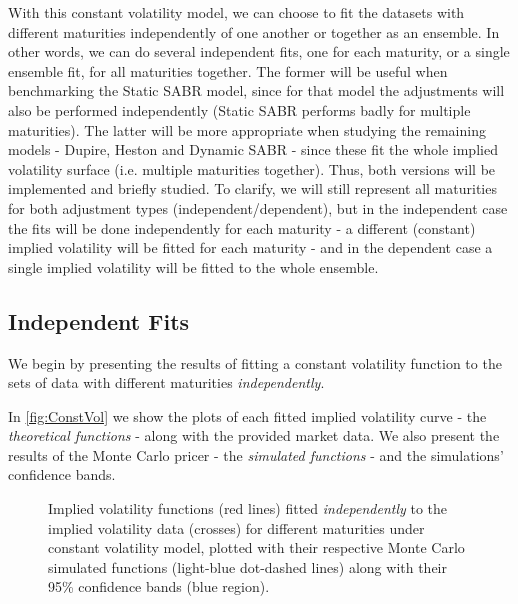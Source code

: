 With this constant volatility model, we can choose to fit the datasets with different maturities independently of one another or together as an ensemble. In other words, we can do several independent fits, one for each maturity, or a single ensemble fit, for all maturities together. The former will be useful when benchmarking the Static SABR model, since for that model the adjustments will also be performed independently (Static SABR performs badly for multiple maturities). The latter will be more appropriate when studying the remaining models - Dupire, Heston and Dynamic SABR - since these fit the whole implied volatility surface (i.e. multiple maturities together). Thus, both versions will be implemented and briefly studied. To clarify, we will still represent all maturities for both adjustment types (independent/dependent), but in the independent case the fits will be done independently for each maturity - a different (constant) implied volatility will be fitted for each maturity - and in the dependent case a single implied volatility will be fitted to the whole ensemble.


\newpage
\subsection{Independent Fits}
We begin by presenting the results of fitting a constant volatility function to the sets of data with different maturities \emph{independently}.


In \autoref{fig:ConstVol} we show the plots of each fitted implied volatility curve - the \emph{theoretical functions} - along with the provided market data. We also present the results of the Monte Carlo pricer - the \emph{simulated functions} - and the simulations' confidence bands.
\begin{figure}[H]
  \begin{subfigmatrix}{2}
  \end{subfigmatrix}
  \caption[Implied volatility functions fitted independently to the implied volatility data for different maturities under constant volatility model, plotted with their respective Monte Carlo simulated functions along with their confidence bands.]{Implied volatility functions (red lines) fitted \emph{independently} to the implied volatility data (crosses) for different maturities under constant volatility model, plotted with their respective Monte Carlo simulated functions (light-blue dot-dashed lines) along with their 95\% confidence bands (blue region).}
  \label{fig:ConstVol}
\end{figure}


